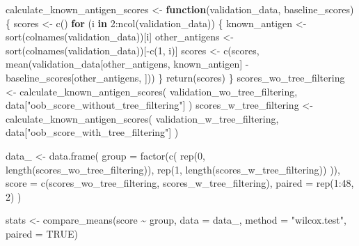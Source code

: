 \documentclass[
  11pt,
  oneside]{book}
\newenvironment{Shaded}{\begin{snugshade}}{\end{snugshade}}
\newcommand{\AttributeTok}[1]{\textcolor[rgb]{0.77,0.63,0.00}{#1}}
\newcommand{\ConstantTok}[1]{\textcolor[rgb]{0.00,0.00,0.00}{#1}}
\newcommand{\ControlFlowTok}[1]{\textcolor[rgb]{0.13,0.29,0.53}{\textbf{#1}}}
\newcommand{\DecValTok}[1]{\textcolor[rgb]{0.00,0.00,0.81}{#1}}
\newcommand{\FunctionTok}[1]{\textcolor[rgb]{0.00,0.00,0.00}{#1}}
\newcommand{\NormalTok}[1]{#1}
\newcommand{\OtherTok}[1]{\textcolor[rgb]{0.56,0.35,0.01}{#1}}
\newcommand{\SpecialCharTok}[1]{\textcolor[rgb]{0.00,0.00,0.00}{#1}}
\newcommand{\StringTok}[1]{\textcolor[rgb]{0.31,0.60,0.02}{#1}}
\begin{document}
\begin{Shaded}
\begin{Highlighting}[]
\NormalTok{calculate\_known\_antigen\_scores }\OtherTok{\textless{}{-}} \ControlFlowTok{function}\NormalTok{(validation\_data, baseline\_scores) \{}
\NormalTok{  scores }\OtherTok{\textless{}{-}} \FunctionTok{c}\NormalTok{()}
  \ControlFlowTok{for}\NormalTok{ (i }\ControlFlowTok{in} \DecValTok{2}\SpecialCharTok{:}\FunctionTok{ncol}\NormalTok{(validation\_data)) \{}
\NormalTok{    known\_antigen }\OtherTok{\textless{}{-}} \FunctionTok{sort}\NormalTok{(}\FunctionTok{colnames}\NormalTok{(validation\_data))[i]}
\NormalTok{    other\_antigens }\OtherTok{\textless{}{-}} \FunctionTok{sort}\NormalTok{(}\FunctionTok{colnames}\NormalTok{(validation\_data))[}\SpecialCharTok{{-}}\FunctionTok{c}\NormalTok{(}\DecValTok{1}\NormalTok{, i)]}
\NormalTok{    scores }\OtherTok{\textless{}{-}} \FunctionTok{c}\NormalTok{(scores, }\FunctionTok{mean}\NormalTok{(validation\_data[other\_antigens, known\_antigen] }\SpecialCharTok{{-}}\NormalTok{ baseline\_scores[other\_antigens, ]))}
\NormalTok{  \}}
  \FunctionTok{return}\NormalTok{(scores)}
\NormalTok{\}}
\NormalTok{scores\_wo\_tree\_filtering }\OtherTok{\textless{}{-}} \FunctionTok{calculate\_known\_antigen\_scores}\NormalTok{(}
\NormalTok{  validation\_wo\_tree\_filtering,}
\NormalTok{  data[}\StringTok{"oob\_score\_without\_tree\_filtering"}\NormalTok{]}
\NormalTok{)}
\NormalTok{scores\_w\_tree\_filtering }\OtherTok{\textless{}{-}} \FunctionTok{calculate\_known\_antigen\_scores}\NormalTok{(}
\NormalTok{  validation\_w\_tree\_filtering,}
\NormalTok{  data[}\StringTok{"oob\_score\_with\_tree\_filtering"}\NormalTok{]}
\NormalTok{)}

\NormalTok{data\_ }\OtherTok{\textless{}{-}} \FunctionTok{data.frame}\NormalTok{(}
  \AttributeTok{group =} \FunctionTok{factor}\NormalTok{(}\FunctionTok{c}\NormalTok{(}
    \FunctionTok{rep}\NormalTok{(}\DecValTok{0}\NormalTok{, }\FunctionTok{length}\NormalTok{(scores\_wo\_tree\_filtering)),}
    \FunctionTok{rep}\NormalTok{(}\DecValTok{1}\NormalTok{, }\FunctionTok{length}\NormalTok{(scores\_w\_tree\_filtering))}
\NormalTok{  )),}
  \AttributeTok{score =} \FunctionTok{c}\NormalTok{(scores\_wo\_tree\_filtering, scores\_w\_tree\_filtering),}
  \AttributeTok{paired =} \FunctionTok{rep}\NormalTok{(}\DecValTok{1}\SpecialCharTok{:}\DecValTok{48}\NormalTok{, }\DecValTok{2}\NormalTok{)}
\NormalTok{)}

\NormalTok{stats }\OtherTok{\textless{}{-}} \FunctionTok{compare\_means}\NormalTok{(score }\SpecialCharTok{\textasciitilde{}}\NormalTok{ group, }\AttributeTok{data =}\NormalTok{ data\_, }\AttributeTok{method =} \StringTok{"wilcox.test"}\NormalTok{, }\AttributeTok{paired =} \ConstantTok{TRUE}\NormalTok{)}


\end{Highlighting}
\end{Shaded}
\end{document}
